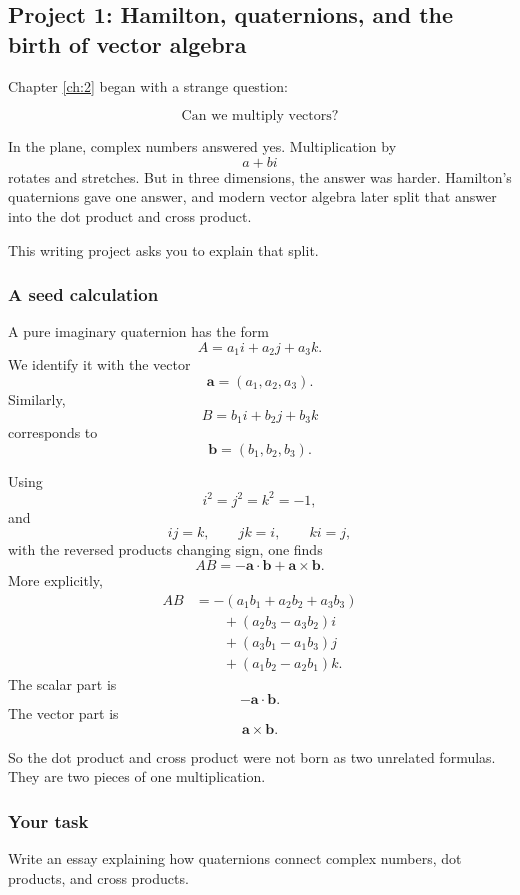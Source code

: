 \subsection{Project 1: Hamilton, quaternions, and the birth of vector algebra}

Chapter \ref{ch:2} began with a strange question:

\[
    \text{Can we multiply vectors?}
\]

In the plane, complex numbers answered yes.  Multiplication by
\[
    a+bi
\]
rotates and stretches.  But in three dimensions, the answer was harder.  Hamilton's
quaternions gave one answer, and modern vector algebra later split that answer into
the dot product and cross product.

This writing project asks you to explain that split.

\subsubsection*{A seed calculation}

A pure imaginary quaternion has the form
\[
    A=a_1i+a_2j+a_3k.
\]
We identify it with the vector
\[
    \mathbf a=(a_1,a_2,a_3).
\]
Similarly,
\[
    B=b_1i+b_2j+b_3k
\]
corresponds to
\[
    \mathbf b=(b_1,b_2,b_3).
\]

Using
\[
    i^2=j^2=k^2=-1,
\]
and
\[
    ij=k,\qquad jk=i,\qquad ki=j,
\]
with the reversed products changing sign, one finds
\[
\boxed{
    AB=-\mathbf a\cdot\mathbf b+\mathbf a\times\mathbf b.
}
\]
More explicitly,
\[
\begin{aligned}
AB
&=
-(a_1b_1+a_2b_2+a_3b_3)\\
&\qquad
+
(a_2b_3-a_3b_2)i\\
&\qquad
+
(a_3b_1-a_1b_3)j\\
&\qquad
+
(a_1b_2-a_2b_1)k.
\end{aligned}
\]
The scalar part is
\[
    -\mathbf a\cdot\mathbf b.
\]
The vector part is
\[
    \mathbf a\times\mathbf b.
\]

So the dot product and cross product were not born as two unrelated formulas.  They
are two pieces of one multiplication.

\subsubsection*{Your task}

Write an essay explaining how quaternions connect complex numbers, dot products, and
cross products.

